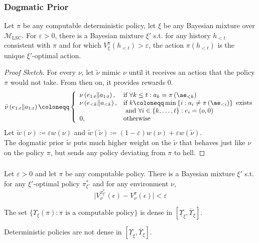 \documentclass[UTF8,11pt,colorlinks,compress,openany]{beamer}%
\begin{document}
\begin{frame}\frametitle{Dogmatic Prior}
\setlength\abovedisplayskip{0pt}
\setlength\belowdisplayskip{0pt}
	\begin{theorem}
		Let $\pi$ be any computable deterministic policy, let $\xi$ be any Bayesian mixture over $\mathcal{M}_{\mathrm{LSC}}$.	For $\varepsilon>0$, there is a Bayesian mixture $\xi'$ s.t. for any history $h_{<t}$ consistent with $\pi$ and for which $V_\xi^\pi(h_{<t})>\varepsilon$, the action $\pi(h_{<t})$ is the unique $\xi'$-optimal action.
	\end{theorem}
	\begin{proof}[Proof Sketch]
		For every $\nu$, let $\tilde{\nu}$ mimic $\nu$ until it receives an action that the policy $\pi$ would not take. From then on, it provides rewards $0$.
		\[
		\tilde{\nu}\left(e_{1:t} \| a_{1:t}\right)\coloneqq \left\{\begin{array}{ll}{\nu\left(e_{1:t} \| a_{1:t}\right),} & \mbox{if } \forall k \leq t: a_k=\pi\left(\ae_{<k}\right)\\
		{\nu\left(e_{<k} \| a_{<k}\right),} & \mbox{if } k\coloneqq \min\left\{i:a_i \ne \pi\left(\ae_{<i}\right)\right\} \mbox{ exists}\\
		{} & \mbox{ and } \forall i \in\{k,\dots,t\}: e_i=(o,0)\\
		{0,} & \mbox{otherwise}\end{array}\right.
		\]
	Let	$\tilde{w}(\nu)\coloneqq \varepsilon w(\nu)$ and $\tilde{w}(\tilde{\nu})\coloneqq (1-\varepsilon)w(\nu)+\varepsilon w(\tilde{\nu})$.\\
	The dogmatic prior $\tilde{w}$ puts much higher weight on the $\tilde{\nu}$ that behaves just like $\nu$ on the policy $\pi$, but sends any policy deviating from $\pi$ to hell.
	\end{proof}
\end{frame}

\begin{frame}\frametitle{}
	\begin{theorem}
		Let $\varepsilon> 0$ and let $\pi$ be any
		computable policy. There is a Bayesian mixture $\xi'$ s.t. for any $\xi'$-optimal policy $\pi_{\xi'}^*$ and for any environment $\nu$,
		\[\Big|V_\nu^{\pi_{\xi'}^*}(\epsilon)-V_\nu^\pi(\epsilon)\Big|<\varepsilon\]
	\end{theorem}
	\begin{theorem}
		The set $\big\{\Upsilon_\xi(\pi): \pi \mbox{ is a computable policy}\big\}$ is dense in $\left[\underline\Upsilon_\xi,\overline\Upsilon_\xi\right]$.
	\end{theorem}
	\centerline{Deterministic policies are not dense in $\left[\underline\Upsilon_\xi,\overline\Upsilon_\xi\right]$.}
\end{frame}
\end{document}
